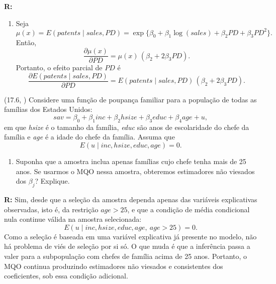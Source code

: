 \documentclass[12pt,letterpaper,onecolumn]{exam}
\renewenvironment{solution}
{\par\noindent\textbf{R:}\enspace\color{blue}}
{\par\color{black}}
\begin{document}
\begin{questions}
\begin{solution}
\begin{enumerate}[label=(\roman*)]
    \item Seja
    \[
    \mu(x)=E(patents \mid sales,PD)=\exp\{\beta_0+\beta_1\log(sales)+\beta_2 PD+\beta_3 PD^2\}.
    \]
    Então,
    \[
    \frac{\partial \mu(x)}{\partial PD}
    =
    \mu(x)\,(\beta_2+2\beta_3 PD).
    \]
    Portanto, o efeito parcial de \(PD\) é
    \[
    \frac{\partial E(patents \mid sales,PD)}{\partial PD}
    =
    E(patents \mid sales,PD)\,(\beta_2+2\beta_3 PD).
    \]
\end{enumerate}
\end{solution}

\vspace{0.7cm}

\question\qstar (17.6, \citep{wooldridge2016}) Considere uma função de poupança familiar para a população de todas as famílias dos Estados Unidos:
\[
sav = \beta_0 + \beta_1 inc + \beta_2 hsize + \beta_3 educ + \beta_4 age + u,
\]
em que \textit{hsize} é o tamanho da família, \textit{educ} são anos de escolaridade do chefe da família e \textit{age} é a idade do chefe da família. Assuma que
\[
E(u \mid inc,hsize,educ,age)=0.
\]
\begin{enumerate}[label=(\roman*)]
    \item Suponha que a amostra inclua apenas famílias cujo chefe tenha mais de 25 anos. Se usarmos o MQO nessa amostra, obteremos estimadores não viesados dos \(\beta_j\)? Explique.
\end{enumerate}

\begin{solution}
Sim, desde que a seleção da amostra dependa apenas das variáveis explicativas observadas, isto é, da restrição \(age>25\), e que a condição de média condicional nula continue válida na amostra selecionada:
\[
E(u \mid inc,hsize,educ,age,\ age>25)=0.
\]
Como a seleção é baseada em uma variável explicativa já presente no modelo, não há problema de viés de seleção por si só. O que muda é que a inferência passa a valer para a subpopulação com chefes de família acima de 25 anos. Portanto, o MQO continua produzindo estimadores não viesados e consistentes dos coeficientes, sob essa condição adicional.
\end{solution}

\vspace{0.7cm}


\end{questions}
\end{document}
